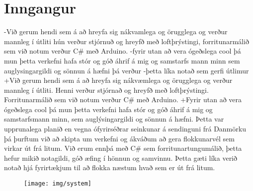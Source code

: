 \section{Inngangur}
-Við gerum hendi sem á að hreyfa sig nákvamlega og örugglega og verður mannleg í útliti hún verður stjórnuð og hreyfð  með  loftþrýstingi, forritunarmálið sem við notum verður C# með Arduino.
-fyrir utan að vera ógeðslega cool þá mun þetta verkefni hafa stór og góð áhrif á mig og samstarfs mann minn sem auglysingargildi og sönnun á hæfni þá verður
-þetta líka notað sem gerfi útlimur
+Við gerum hendi sem á að hreyfa sig nákvæmlega og örugglega og verður mannleg í útliti. Henni verður stjórnað og hreyfð  með  loftþrýstingi. Forritunarmálið sem við notum verður C# með Arduino.
+Fyrir utan að vera ógeðslega cool þá mun þetta verkefni hafa stór og góð áhrif á mig og samstarfsmann minn, sem auglýsingargildi og sönnun á hæfni. Þetta var upprunalega planið en vegna ófyrirséðrar seinkunar á sendinguni frá Danmörku þá þurftum við að skipta um verkefni og ákváðum að gera flokkunarvél sem virkar út frá litum. Við erum ennþá með C# sem forritunartungumálið, þetta hefur mikið notagildi, góð æfing í hönnun og samvinnu. Þetta gæti líka verið notað hjá fyrirtækjum til að flokka næstum hvað sem er út frá litum.
\begin{figure}[h]
\texttt{[image: img/system]}
\end{figure}